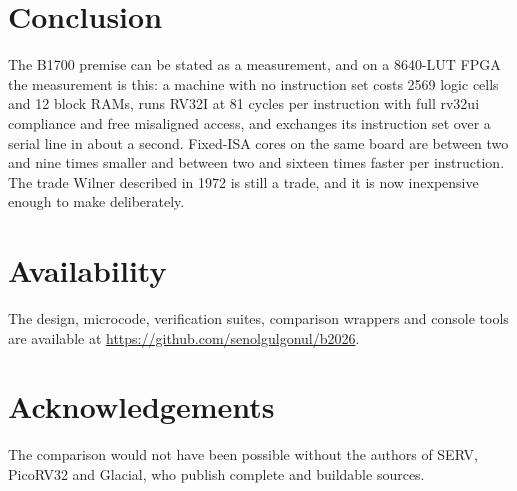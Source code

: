 \documentclass[11pt,a4paper]{article}
\begin{document}
\section{Conclusion}

The B1700 premise can be stated as a measurement, and on a 8640-LUT
FPGA the measurement is this: a machine with no instruction set costs
2569 logic cells and 12 block RAMs, runs RV32I at 81 cycles per
instruction with full rv32ui compliance and free misaligned access, and
exchanges its instruction set over a serial line in about a second.
Fixed-ISA cores on the same board are between two and nine times
smaller and between two and sixteen times faster per instruction. The
trade Wilner described in 1972 is still a trade, and it is now
inexpensive enough to make deliberately.

\section*{Availability}

The design, microcode, verification suites, comparison wrappers and
console tools are available at \url{https://github.com/senolgulgonul/b2026}.

\section*{Acknowledgements}

The comparison would not have been possible without the authors of
SERV, PicoRV32 and Glacial, who publish complete and buildable sources.
\end{document}
